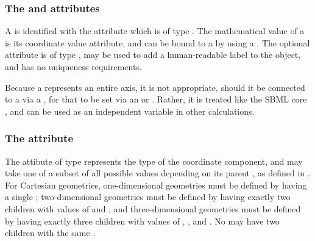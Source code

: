 \subsubsection{The \fixttspace{} and \fixttspace{} attributes}
A \CoordinateComponent is identified with the  attribute which is of type .  The mathematical value of a \CoordinateComponent is its coordinate value  attribute, and can be bound to a \Parameter by using a \SpatialSymbolReference.  The optional  attribute is of type , may be used to add a human-readable label to the object, and has no uniqueness requirements.
 
Because a \CoordinateComponent represents an entire axis, it is not appropriate, should it be connected to a \Parameter via a \SpatialSymbolReference, for that \Parameter to be set via an \InitialAssignment or \Rule.  Rather, it is treated like the SBML core  , and can be used as an independent variable in other calculations.

\subsubsection{The \fixttspace{} attribute}
The  attibute of type  represents the type of the coordinate component, and may take one of a subset of all possible  values depending on its parent \Geometry, as defined in .
For Cartesian geometries, one-dimensional geometries must be defined by having a single  \CoordinateComponent; two-dimensional geometries must be defined by having exactly two \CoordinateComponent children with  values of  and , and three-dimensional geometries must be defined by having exactly three \CoordinateComponent children with  values of , , and .  No \Geometry may have two \CoordinateComponent children with the same .

